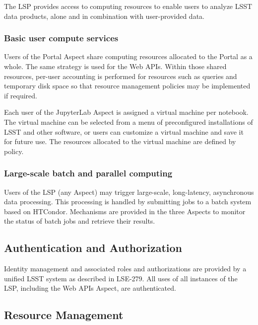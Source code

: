 The LSP provides access to computing resources to enable users to analyze
LSST data products, alone and in combination with user-provided data.

\subsubsection{Basic user compute services}\label{basic-user-compute-services}

Users of the Portal Aspect share computing resources allocated to the Portal as
a whole.  The same strategy is used for the Web APIs.  Within those shared
resources, per-user accounting is performed for resources such as queries and
temporary disk space so that resource management policies may be implemented
if required.

Each user of the JupyterLab Aspect is assigned a virtual machine per notebook.
The virtual machine can be selected from a menu of preconfigured installations
of LSST and other software, or users can customize a virtual machine and save
it for future use.  The resources allocated to the virtual machine are
defined by policy.

\subsubsection{Large-scale batch and parallel computing}\label{large-scale-batch-and-parallel-computing}

Users of the LSP (any Aspect) may trigger large-scale, long-latency,
asynchronous data processing.  This processing is handled by submitting
jobs to a batch system based on HTCondor.  Mechanisms are provided in the
three Aspects to monitor the status of batch jobs and retrieve their results.

\subsection{Authentication and Authorization}\label{authentication-and-authorization}

Identity management and associated roles and authorizations are provided by a
unified LSST system as described in LSE-279.  All uses of all instances of the
LSP, including the Web APIs Aspect, are authenticated.

\subsection{Resource Management}\label{resource-management}

